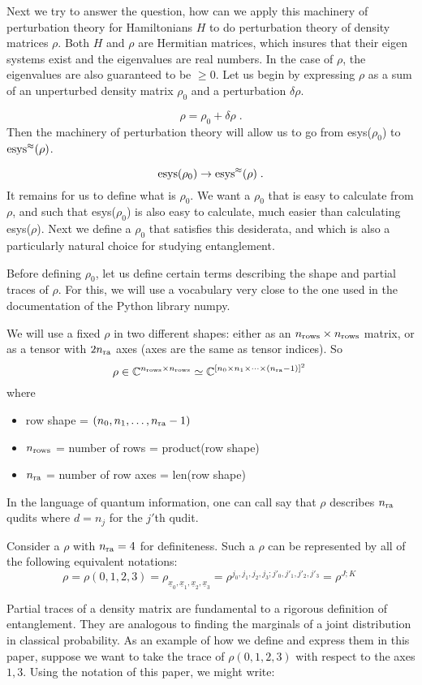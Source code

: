 \documentclass[12pt]{article}%
\newcommand{\beq}{\begin{equation}}
\newcommand{\eeq}{\end{equation}}
\newcommand{\rarrow}[0]{\rightarrow}
\newcommand{\ul}[1]{\underline{#1}}
\newcommand{\CC}[0]{{ \mathbb{C}} }
\newcommand{\rvx}[0]{{\ul{x}}}
\newcommand{\nra}[0]{{n_{\rm ra}}}
\newcommand{\nr}[0]{{n_{\rm rows}}}
\begin{document}
Next we try to answer the question, how
can we apply this machinery of perturbation
theory for Hamiltonians  $H$ to do perturbation
theory of density matrices $\rho$.
Both $H$ and $\rho$ are Hermitian matrices,
which insures that
their eigen systems exist and the eigenvalues are real
numbers. In the case of $\rho$,
the eigenvalues are also guaranteed to be $\geq 0$.
Let us begin by expressing $\rho$
as a sum of an unperturbed density matrix $\rho_0$
and a perturbation $\delta \rho$.

\beq
\rho = \rho_0 + \delta \rho
\;.
\eeq
Then the machinery of perturbation
theory will allow us to go from
esys($\rho_0$) to ${\rm esys^\approx(\rho)}$.

\beq
{\rm esys}(\rho_0) \rarrow {\rm esys^\approx(\rho)}
\;.
\eeq
It remains for us to define what is $\rho_0$.
We want a $\rho_0$ that
is easy to calculate
from $\rho$,
and such that esys($\rho_0$) is also easy to
calculate, much easier
than calculating esys($\rho$).
Next we define
a $\rho_0$ that satisfies this desiderata, and
which is also a particularly natural
choice for studying entanglement.

Before defining $\rho_0$, let us
define certain terms describing
the shape and partial traces of $\rho$.
For this, we will use a vocabulary
very close to the one used in the
documentation of the Python library numpy.

We will use a fixed $\rho$ in two different shapes:
either as an $\nr\times\nr$ matrix,
or as a tensor with $2\nra$ axes (axes are the same as
tensor indices). So
\beq
\rho \in \CC^{\nr\times\nr}
\simeq \CC^{[n_0\times n_1 \times\cdots\times(\nra-1)]^2}
\;
\eeq
where

\begin{itemize}
\item row shape = $(n_0, n_1, \ldots, \nra-1)$
\item $\nr$ = number of rows = product(row shape)
\item $\nra$ = number of row axes = len(row shape)
\end{itemize}
In the language of quantum information,
one can call say that $\rho$ describes $\nra$
qudits where $d=n_j$ for the $j'$th qudit.

Consider a $\rho$
with $\nra = 4$ for definiteness.
Such a $\rho$ can be represented by all of the following
equivalent notations:
\beq
\rho= \rho(0, 1, 2, 3) =\rho_{\rvx_0, \rvx_1, \rvx_2, \rvx_3}=
\rho^{j_0, j_1, j_2, j_3; j'_0, j'_1, j'_2, j'_3}
=\rho^{J;K}
\;
\eeq

Partial traces
of a density matrix
are fundamental to a rigorous definition
of entanglement. They are analogous to
finding the marginals of a
joint distribution in classical
probability. As an example of how we define
and express them in this paper,
suppose we want to
take the trace of $\rho(0, 1, 2, 3)$
with respect to the axes $1, 3$.
Using the notation of
this paper, we might write:
\end{document}
